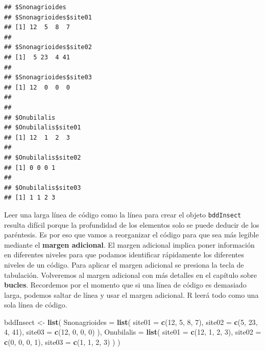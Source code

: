 \documentclass[
]{book}
\newenvironment{Shaded}{\begin{snugshade}}{\end{snugshade}}
\newcommand{\DataTypeTok}[1]{\textcolor[rgb]{0.13,0.29,0.53}{#1}}
\newcommand{\DecValTok}[1]{\textcolor[rgb]{0.00,0.00,0.81}{#1}}
\newcommand{\KeywordTok}[1]{\textcolor[rgb]{0.13,0.29,0.53}{\textbf{#1}}}
\newcommand{\NormalTok}[1]{#1}
\newcommand{\StringTok}[1]{\textcolor[rgb]{0.31,0.60,0.02}{#1}}
\begin{document}
\begin{verbatim}
## $Snonagrioides
## $Snonagrioides$site01
## [1] 12  5  8  7
## 
## $Snonagrioides$site02
## [1]  5 23  4 41
## 
## $Snonagrioides$site03
## [1] 12  0  0  0
## 
## 
## $Onubilalis
## $Onubilalis$site01
## [1] 12  1  2  3
## 
## $Onubilalis$site02
## [1] 0 0 0 1
## 
## $Onubilalis$site03
## [1] 1 1 2 3
\end{verbatim}

Leer una larga línea de código como la línea para crear el objeto \texttt{bddInsect} resulta difícil porque la profundidad de los elementos solo se puede deducir de los paréntesis. Es por eso que vamos a reorganizar el código para que sea más legible mediante el \textbf{margen adicional}. El margen adicional implica poner información en diferentes niveles para que podamos identificar rápidamente los diferentes niveles de un código. Para aplicar el margen adicional se presiona la tecla de tabulación. Volveremos al margen adicional con más detalles en el capítulo sobre \textbf{bucles}. Recordemos por el momento que si una línea de código es demasiado larga, podemos saltar de línea y usar el margen adicional. R leerá todo como una sola línea de código.

\begin{Shaded}
\begin{Highlighting}[]
\NormalTok{bddInsect <-}\StringTok{ }\KeywordTok{list}\NormalTok{(}
  \DataTypeTok{Snonagrioides =} \KeywordTok{list}\NormalTok{(}
    \DataTypeTok{site01 =} \KeywordTok{c}\NormalTok{(}\DecValTok{12}\NormalTok{, }\DecValTok{5}\NormalTok{, }\DecValTok{8}\NormalTok{, }\DecValTok{7}\NormalTok{), }
    \DataTypeTok{site02 =} \KeywordTok{c}\NormalTok{(}\DecValTok{5}\NormalTok{, }\DecValTok{23}\NormalTok{, }\DecValTok{4}\NormalTok{, }\DecValTok{41}\NormalTok{), }
    \DataTypeTok{site03 =} \KeywordTok{c}\NormalTok{(}\DecValTok{12}\NormalTok{, }\DecValTok{0}\NormalTok{, }\DecValTok{0}\NormalTok{, }\DecValTok{0}\NormalTok{)}
\NormalTok{  ), }
  \DataTypeTok{Onubilalis =} \KeywordTok{list}\NormalTok{(}
    \DataTypeTok{site01 =} \KeywordTok{c}\NormalTok{(}\DecValTok{12}\NormalTok{, }\DecValTok{1}\NormalTok{, }\DecValTok{2}\NormalTok{, }\DecValTok{3}\NormalTok{), }
    \DataTypeTok{site02 =} \KeywordTok{c}\NormalTok{(}\DecValTok{0}\NormalTok{, }\DecValTok{0}\NormalTok{, }\DecValTok{0}\NormalTok{, }\DecValTok{1}\NormalTok{), }
    \DataTypeTok{site03 =} \KeywordTok{c}\NormalTok{(}\DecValTok{1}\NormalTok{, }\DecValTok{1}\NormalTok{, }\DecValTok{2}\NormalTok{, }\DecValTok{3}\NormalTok{)}
\NormalTok{  )}
\NormalTok{)}
\end{Highlighting}
\end{Shaded}
\end{document}
